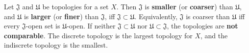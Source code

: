 Let $\mathfrak{J}$ and $\mathfrak{U}$ be topologies for a set $X$. Then $\mathfrak{J}$ is \textbf{smaller} (or \textbf{coarser}) than $\mathfrak{U}$, and $\mathfrak{U}$ is \textbf{larger} (or \textbf{finer}) than $\mathfrak{J}$, iff $\mathfrak{J} \subset \mathfrak{U}$. Equivalently, $\mathfrak{J}$ is coarser than $\mathfrak{U}$ iff every $\mathfrak{J}$-open set is $\mathfrak{U}$-open. If neither $\mathfrak{J} \subset \mathfrak{U}$ nor $\mathfrak{U} \subset \mathfrak{J}$, the topologies are \textbf{not comparable}. The discrete topology is the largest topology for $X$, and the indiscrete topology is the smallest.
